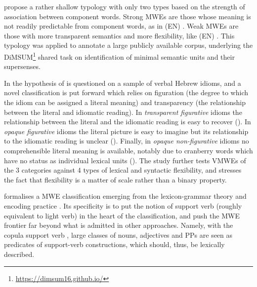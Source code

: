 \documentclass[output=paper,
modfonts,
]{langscibook}
\begin{document}
\citet{schneider2014} propose a rather shallow typology with only two types based on the strength of association between component words. Strong MWEs are those whose meaning is not readily predictable from component words, as in (EN) . Weak MWEs are those with more transparent semantics and more flexibility, like (EN) . This typology was applied to annotate a large publicly available corpus, underlying the DiMSUM\footnote{\url{https://dimsum16.github.io/}} shared task on identification of minimal semantic units and their supersenses.

In \citet{Sheinful17} the  hypothesis of \citet{nunberg-94} is questioned on a sample of verbal Hebrew idioms, and a novel classification is put forward which relies on figuration (the degree to which the idiom can be assigned a literal meaning) and transparency (the relationship between the literal and idiomatic reading). In \emph{transparent figurative} idioms the relationship between the literal and the idiomatic reading is easy to recover (). In \emph{opaque figurative} idioms the literal picture is easy to imagine but its relationship to the idiomatic reading is unclear (). Finally, in \emph{opaque non-figurative} idioms no comprehensible literal meaning is available, notably due to cranberry words which have no status as individual lexical units (). The study further tests VMWEs of the 3 categories against 4 types of lexical and syntactic flexibility, and stresses the fact that flexibility is a matter of scale rather than a binary property.

\citet{Laporte:forth} formalises a MWE classification emerging from the lexicon-grammar theory and encoding practice \citep{Gross:1986:LRC:991365.991367,gross:hal-00621380}. Its specificity is to put the notion of support verb (roughly equivalent to light verb) in the heart of the classification, and push the MWE frontier far beyond what is admitted in other approaches. Namely, with the copula support verb , large classes of nouns, adjectives and PPs are seen as predicates of support-verb constructions, which should, thus, be lexically described.
\end{document}
